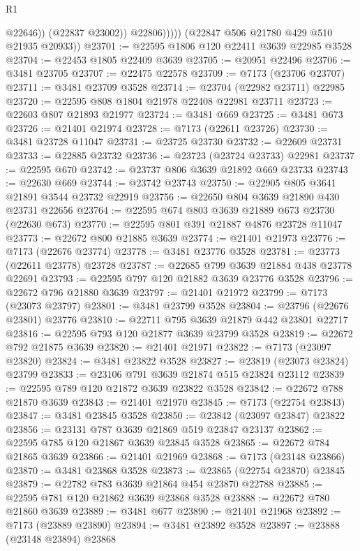 \begin{lexlean}{R1}
\begin{coremodule}
                      @22646))
                  (@22837 @23002))
                @22806)))))
      (@22847 @506 @21780 @429 @510 @21935 @20933))
@23701 := @22595 @1806 @120 @22411 @3639 @22985 @3528
@23704 := @22453 @1805 @22409 @3639
@23705 := @20951 @22496
@23706 := @3481 @23705
@23707 := @22475 @22578
@23709 := @7173 (@23706 @23707)
@23711 := @3481 @23709 @3528
@23714 := @23704 (@22982 @23711) @22985
@23720 := @22595 @808 @1804 @21978 @22408 @22981 @23711
@23723 := @22603 @807 @21893 @21977
@23724 := @3481 @669
@23725 := @3481 @673
@23726 := @21401 @21974
@23728 := @7173 (@22611 @23726)
@23730 := @3481 @23728 @11047
@23731 := @23725 @23730
@23732 := @22609 @23731
@23733 := @22885 @23732
@23736 := @23723 (@23724 @23733) @22981
@23737 := @22595 @670
@23742 := @23737 @806 @3639 @21892 @669 @23733
@23743 := @22630 @669
@23744 := @23742 @23743
@23750 := @22905 @805 @3641 @21891 @3544 @23732 @22919
@23756 := @22650 @804 @3639 @21890 @430 @23731 @22656
@23764 := @22595 @674 @803 @3639 @21889 @673 @23730 (@22630 @673)
@23770 := @22595 @801 @391 @21887 @4876 @23728 @11047
@23773 := @22672 @800 @21885 @3639
@23774 := @21401 @21973
@23776 := @7173 (@22676 @23774)
@23778 := @3481 @23776 @3528
@23781 := @23773 (@22611 @23778) @23728
@23787 := @22685 @799 @3639 @21884 @438 @23778 @22691
@23793 := @22595 @797 @120 @21882 @3639 @23776 @3528
@23796 := @22672 @796 @21880 @3639
@23797 := @21401 @21972
@23799 := @7173 (@23073 @23797)
@23801 := @3481 @23799 @3528
@23804 := @23796 (@22676 @23801) @23776
@23810 := @22711 @795 @3639 @21879 @442 @23801 @22717
@23816 := @22595 @793 @120 @21877 @3639 @23799 @3528
@23819 := @22672 @792 @21875 @3639
@23820 := @21401 @21971
@23822 := @7173 (@23097 @23820)
@23824 := @3481 @23822 @3528
@23827 := @23819 (@23073 @23824) @23799
@23833 := @23106 @791 @3639 @21874 @515 @23824 @23112
@23839 := @22595 @789 @120 @21872 @3639 @23822 @3528
@23842 := @22672 @788 @21870 @3639
@23843 := @21401 @21970
@23845 := @7173 (@22754 @23843)
@23847 := @3481 @23845 @3528
@23850 := @23842 (@23097 @23847) @23822
@23856 := @23131 @787 @3639 @21869 @519 @23847 @23137
@23862 := @22595 @785 @120 @21867 @3639 @23845 @3528
@23865 := @22672 @784 @21865 @3639
@23866 := @21401 @21969
@23868 := @7173 (@23148 @23866)
@23870 := @3481 @23868 @3528
@23873 := @23865 (@22754 @23870) @23845
@23879 := @22782 @783 @3639 @21864 @454 @23870 @22788
@23885 := @22595 @781 @120 @21862 @3639 @23868 @3528
@23888 := @22672 @780 @21860 @3639
@23889 := @3481 @677
@23890 := @21401 @21968
@23892 := @7173 (@23889 @23890)
@23894 := @3481 @23892 @3528
@23897 := @23888 (@23148 @23894) @23868

\end{coremodule}
\end{lexlean}
